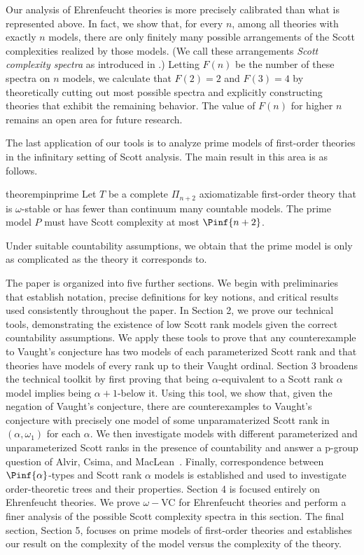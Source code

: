 \documentclass{amsart}
\renewcommand{\-}{\text{-}}
\begin{document}
Our analysis of Ehrenfeucht theories is more precisely calibrated than what is represented above.
In fact, we show that, for every $n$, among all theories with exactly $n$ models, there are only finitely many possible arrangements of the Scott complexities realized by those models. 
(We call these arrangements \emph{Scott complexity spectra} as introduced in \cite{GLRS}.)
Letting $F(n)$ be the number of these spectra on $n$ models, we calculate that $F(2)=2$ and $F(3)=4$ by theoretically cutting out most possible spectra and explicitly constructing theories that exhibit the remaining behavior.
The value of $F(n)$ for higher $n$ remains an open area for future research.

The last application of our tools is to analyze prime models of first-order theories in the infinitary setting of Scott analysis.
The main result in this area is as follows.
\begin{restatable*}{theorem}{pinprime}\label{thm:pinprime}
Let $T$ be a complete $\Pi_{n+2}$ axiomatizable first-order theory that is $\omega$-stable or has fewer than continuum many countable models.
The prime model $P$ must have Scott complexity at most $\Pinf{n+2}$.
\end{restatable*}

Under suitable countability assumptions, we obtain that the prime model is only as complicated as the theory it corresponds to.

The paper is organized into five further sections.
We begin with preliminaries that establish notation, precise definitions for key notions, and critical results used consistently throughout the paper.
In Section 2, we prove our technical tools, demonstrating the existence of low Scott rank models given the correct countability assumptions.
We apply these tools to prove that any counterexample to Vaught's conjecture has two models of each parameterized Scott rank and that theories have models of every rank up to their Vaught ordinal.
Section 3 broadens the technical toolkit by first proving that being $\alpha$-equivalent to a Scott rank $\alpha$ model implies being $\alpha+1$-below it.
Using this tool, we show that, given the negation of Vaught's conjecture, there are counterexamples to Vaught's conjecture with precisely one model of some unparamaterized Scott rank in $(\alpha,\omega_1)$ for each $\alpha$.
We then investigate models with different parameterized and unparameterized Scott ranks in the presence of countability and answer a p-group question of Alvir, Csima, and MacLean~\cite{ACM24}.
Finally, correspondence between $\Pinf{\alpha}$-types and Scott rank $\alpha$ models is established and used to investigate order-theoretic trees and their properties.
Section 4 is focused entirely on Ehrenfeucht theories.
We prove $\omega-$VC for Ehrenfeucht theories and perform a finer analysis of the possible Scott complexity spectra in this section.
The final section, Section 5, focuses on prime models of first-order theories and establishes our result on the complexity of the model versus the complexity of the theory.
\end{document}
